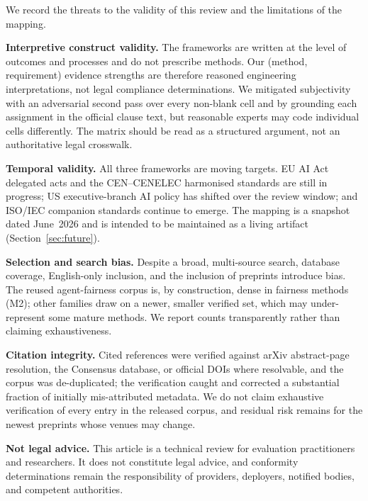 We record the threats to the validity of this review and the limitations of the mapping.

\textbf{Interpretive construct validity.} The frameworks are written at the level of
outcomes and processes and do not prescribe methods. Our (method, requirement) evidence
strengths are therefore reasoned engineering interpretations, not legal compliance
determinations. We mitigated subjectivity with an adversarial second pass over every
non-blank cell and by grounding each assignment in the official clause text, but
reasonable experts may code individual cells differently. The matrix should be read as a
structured argument, not an authoritative legal crosswalk.

\textbf{Temporal validity.} All three frameworks are moving targets. EU AI Act delegated
acts and the CEN--CENELEC harmonised standards are still in progress; US executive-branch
AI policy has shifted over the review window; and ISO/IEC companion standards continue to
emerge. The mapping is a snapshot dated June~2026 and is intended to be maintained as a
living artifact (Section~\ref{sec:future}).

\textbf{Selection and search bias.} Despite a broad, multi-source search, database
coverage, English-only inclusion, and the inclusion of preprints introduce bias. The
reused agent-fairness corpus is, by construction, dense in fairness methods (M2); other
families draw on a newer, smaller verified set, which may under-represent some mature
methods. We report counts transparently rather than claiming exhaustiveness.

\textbf{Citation integrity.} Cited references were verified against arXiv abstract-page
resolution, the Consensus database, or official DOIs where resolvable, and the corpus was
de-duplicated; the verification caught and corrected a substantial fraction of initially
mis-attributed metadata. We do not claim exhaustive verification of every entry in the
released corpus, and residual risk remains for the newest preprints whose venues may change.

\textbf{Not legal advice.} This article is a technical review for evaluation
practitioners and researchers. It does not constitute legal advice, and conformity
determinations remain the responsibility of providers, deployers, notified bodies, and
competent authorities.
